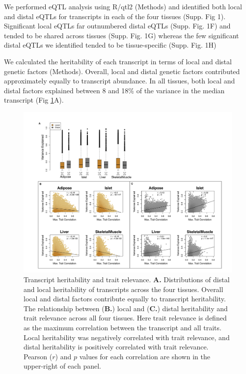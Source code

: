 \documentclass[
]{article}
\begin{document}
We performed eQTL analysis using R/qtl2 \cite{pmid30591514} (Methods)
and identified both local and distal eQTLs for transcripts in each of
the four tissues (Supp. Fig 1). Significant local eQTLs far outnumbered
distal eQTLs (Supp. Fig. 1F) and tended to be shared across tissues
(Supp. Fig. 1G) whereas the few significant distal eQTLs we identified
tended to be tissue-specific (Supp. Fig. 1H)

We calculated the heritability of each transcript in terms of local and
distal genetic factors (Methods). Overall, local and distal genetic
factors contributed approximately equally to transcript abundance. In
all tissues, both local and distal factors explained between 8 and 18\%
of the variance in the median transcript (Fig \ref{fig:motivation}A).

\begin{figure}[ht!]
\includegraphics[width=\textwidth]{Figures/Fig2_motivation.pdf} 
\caption{Transcript heritability and trait relevance. 
\textbf{A.} Distributions of distal and local heritability of 
transcripts across the four tissues. Overall local and distal 
factors contribute equally to transcript heritability. The 
relationship between (\textbf{B.}) local and (\textbf{C.}) 
distal heritability and trait relevance across all four tissues. 
Here trait relevance is defined as the maximum correlation between 
the transcript and all traits. Local heritability was negatively 
correlated with trait relevance, and distal heritability is 
positively correlated with trait relevance. Pearson ($r$) and $p$ 
values for each correlation are shown in the upper-right of each panel.}
\label{fig:motivation}
\end{figure}
\end{document}
